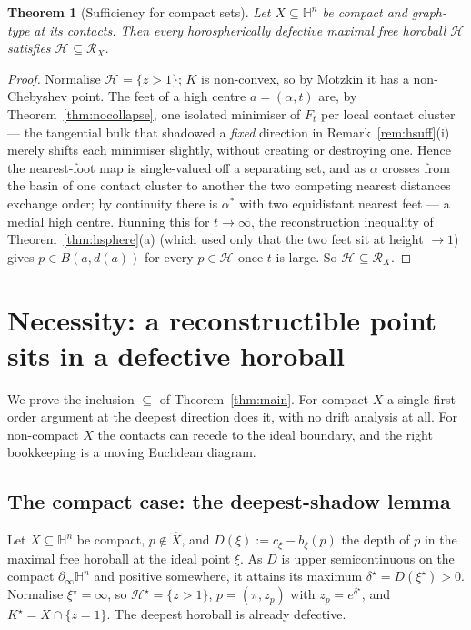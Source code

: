 \documentclass[11pt]{article}
\newtheorem{theorem}{Theorem}[section]
\theoremstyle{remark}
\newcommand{\X}{X}
\newcommand{\Xhat}{\widehat{\X}}
\newcommand{\Rx}{\mathcal{R}_{\X}}
\newcommand{\Hb}[1]{\mathcal{H}_{#1}}
\newcommand{\B}{B}
\newcommand{\bdry}{\partial_{\infty}}
\begin{document}
\begin{theorem}[Sufficiency for compact sets]\label{thm:suffcompact}
Let $\X\subseteq\mathbb{H}^{n}$ be compact and graph-type at its
contacts. Then every horospherically defective maximal free horoball
$\Hb{}$ satisfies $\Hb{}\subseteq\Rx$.
\end{theorem}

\begin{proof}
Normalise $\Hb{}=\{z>1\}$; $K$ is non-convex, so by Motzkin it has a
non-Chebyshev point. The feet of a high centre $a=(\alpha,t)$ are, by
Theorem~\ref{thm:nocollapse}, one isolated minimiser of $F_{t}$ per
local contact cluster --- the tangential bulk that shadowed a
\emph{fixed} direction in Remark~\ref{rem:hsuff}(i) merely shifts each
minimiser slightly, without creating or destroying one. Hence the
nearest-foot map is single-valued off a separating set, and as
$\alpha$ crosses from the basin of one contact cluster to another the
two competing nearest distances exchange order; by continuity there is
$\alpha^{\ast}$ with two equidistant nearest feet --- a medial high
centre. Running this for $t\to\infty$, the reconstruction inequality
of Theorem~\ref{thm:hsphere}(a) (which used only that the two feet sit
at height $\to1$) gives $p\in\B(a,d(a))$ for every $p\in\Hb{}$ once
$t$ is large. So $\Hb{}\subseteq\Rx$.
\end{proof}

\section{Necessity: a reconstructible point sits in a defective horoball}\label{sec:nec-main}

We prove the inclusion $\subseteq$ of
Theorem~\ref{thm:main}. For compact $\X$ a single first-order argument at
the deepest direction does it, with no drift analysis at all. For
non-compact $\X$ the contacts can recede to the ideal boundary, and the
right bookkeeping is a moving Euclidean diagram.

\subsection{The compact case: the deepest-shadow lemma}\label{sec:kernel}

Let $\X\subseteq\mathbb{H}^{n}$ be compact,
$p\notin\Xhat$, and $D(\xi):=c_{\xi}-b_{\xi}(p)$ the depth of $p$ in the
maximal free horoball at the ideal point $\xi$. As $D$ is upper
semicontinuous on the compact $\bdry\mathbb{H}^{n}$ and positive
somewhere, it attains its maximum $\delta^{\star}=D(\xi^{\star})>0$.
Normalise $\xi^{\star}=\infty$, so $\Hb{}^{\star}=\{z>1\}$,
$p=(\pi,z_{p})$ with $z_{p}=e^{\delta^{\star}}$, and
$K^{\star}=\X\cap\{z=1\}$. The deepest horoball is already defective.
\end{document}
